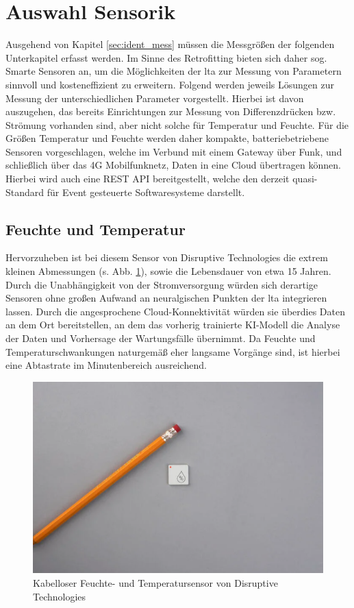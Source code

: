     \section{Auswahl Sensorik}
    \label{sec:auswahl_sens}
    Ausgehend von Kapitel \ref{sec:ident_mess} müssen die Messgrößen der folgenden Unterkapitel erfasst werden. Im Sinne des Retrofitting bieten sich daher sog. Smarte Sensoren an, um die Möglichkeiten der \ac{lta} zur Messung von Parametern sinnvoll und kosteneffizient zu erweitern. \cite{hybride} Folgend werden jeweils Lösungen zur Messung der unterschiedlichen Parameter vorgestellt. Hierbei ist davon auszugehen, das bereits Einrichtungen zur Messung von Differenzdrücken bzw. Strömung vorhanden sind, aber nicht solche für Temperatur und Feuchte. Für die Größen Temperatur und Feuchte werden daher kompakte, batteriebetriebene Sensoren vorgeschlagen, welche im Verbund mit einem Gateway über Funk, und schließlich über das 4G Mobilfunknetz, Daten in eine Cloud übertragen können. Hierbei wird auch eine REST API bereitgestellt, welche den derzeit quasi-Standard für Event gesteuerte Softwaresysteme darstellt.
    \subsection{Feuchte und Temperatur}
    \label{sec:smartsens}
    Hervorzuheben ist bei diesem Sensor von Disruptive Technologies die extrem kleinen Abmessungen (s. Abb. \ref{fi:feuchtesensor}), sowie die Lebensdauer von etwa 15 Jahren. Durch die Unabhängigkeit von der Stromversorgung würden sich derartige Sensoren ohne großen Aufwand an neuralgischen Punkten der \ac{lta} integrieren lassen. Durch die angesprochene Cloud-Konnektivität würden sie überdies Daten an dem Ort bereitstellen, an dem das vorherig trainierte KI-Modell die Analyse der Daten und Vorhersage der Wartungsfälle übernimmt. Da Feuchte und Temperaturschwankungen naturgemäß eher langsame Vorgänge sind, ist hierbei eine Abtastrate im Minutenbereich ausreichend.
    \begin{figure}[H]
        \begin{center}
            \includegraphics[width=0.8\linewidth]{images/feuchtesensor.png}
            \caption[Feuchtesensor]{Kabelloser Feuchte- und Temperatursensor von Disruptive Technologies \cite{disruptive} }
            \label{fi:feuchtesensor}
        \end{center}
    \end{figure} 
